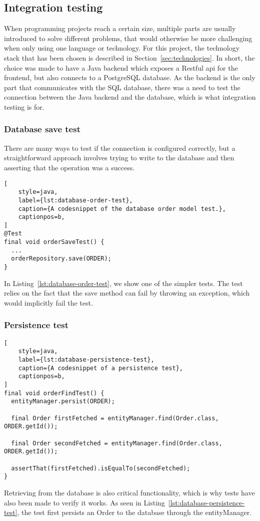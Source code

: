 \subsection{Integration testing}\label{subsec:integration-tests}

When programming projects reach a certain size, multiple parts are usually introduced to solve different problems,
that would otherwise be more challenging when only using one language or technology.
For this project, the technology stack that has been chosen is described in Section~\ref{sec:technologies}.
In short, the choice was made to have a Java backend which exposes a Restful api for the frontend, but also connects to
a PostgreSQL database.
As the backend is the only part that communicates with the SQL database, there was a need to test the connection between
the Java backend and the database, which is what integration testing is for.

\subsubsection{Database save test}\label{subsubsec:database-save-integration-test}

There are many ways to test if the connection is configured correctly, but a straightforward approach involves trying
to write to the database and then asserting that the operation was a success.

\begin{lstlisting}[
    style=java,
    label={lst:database-order-test},
    caption={A codesnippet of the database order model test.},
    captionpos=b,
]
@Test
final void orderSaveTest() {
  ...
  orderRepository.save(ORDER);
}
\end{lstlisting}

In Listing~\ref{lst:database-order-test}, we show one of the simpler tests.
The test relies on the fact that the save method can fail by throwing an exception, which would implicitly fail the
test.
\subsubsection{Persistence test}\label{subsubsec:persistence-integration-test}
\begin{lstlisting}[
    style=java,
    label={lst:database-persistence-test},
    caption={A codesnippet of a persistence test},
    captionpos=b,
]
final void orderFindTest() {
  entityManager.persist(ORDER);

  final Order firstFetched = entityManager.find(Order.class, ORDER.getId());

  final Order secondFetched = entityManager.find(Order.class, ORDER.getId());

  assertThat(firstFetched).isEqualTo(secondFetched);
}
\end{lstlisting}

Retrieving from the database is also critical functionality, which is why tests have also been made to verify it works.
As seen in Listing~\ref{lst:database-persistence-test}, the test first persists an Order to the database through the
entityManager.
